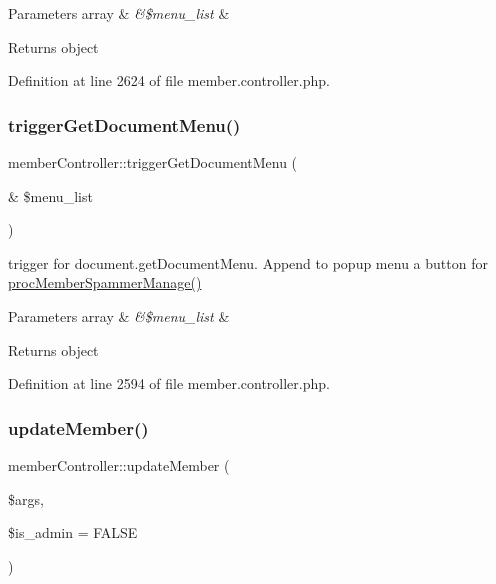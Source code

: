\begin{DoxyParams}[1]{Parameters}
array & {\em \&\$menu\+\_\+list} & \\
\hline
\end{DoxyParams}
\begin{DoxyReturn}{Returns}
object 
\end{DoxyReturn}


Definition at line 2624 of file member.\+controller.\+php.

\mbox{\label{classmemberController_a4f6ca6a2a8db362cac531920762a94f9}} 
\subsubsection{\texorpdfstring{trigger\+Get\+Document\+Menu()}{triggerGetDocumentMenu()}}
{\footnotesize\ttfamily member\+Controller\+::trigger\+Get\+Document\+Menu (\begin{DoxyParamCaption}\item[{\&}]{\$menu\+\_\+list }\end{DoxyParamCaption})}

trigger for document.\+get\+Document\+Menu. Append to popup menu a button for \hyperlink{classmemberController_a99f87aecac7ae283cec747a007df88b8}{proc\+Member\+Spammer\+Manage()}


\begin{DoxyParams}[1]{Parameters}
array & {\em \&\$menu\+\_\+list} & \\
\hline
\end{DoxyParams}
\begin{DoxyReturn}{Returns}
object 
\end{DoxyReturn}


Definition at line 2594 of file member.\+controller.\+php.

\mbox{\label{classmemberController_ac1ad3397eda0a695046b023a14d25496}} 
\subsubsection{\texorpdfstring{update\+Member()}{updateMember()}}
{\footnotesize\ttfamily member\+Controller\+::update\+Member (\begin{DoxyParamCaption}\item[{}]{\$args,  }\item[{}]{\$is\+\_\+admin = {\ttfamily FALSE} }\end{DoxyParamCaption})}

